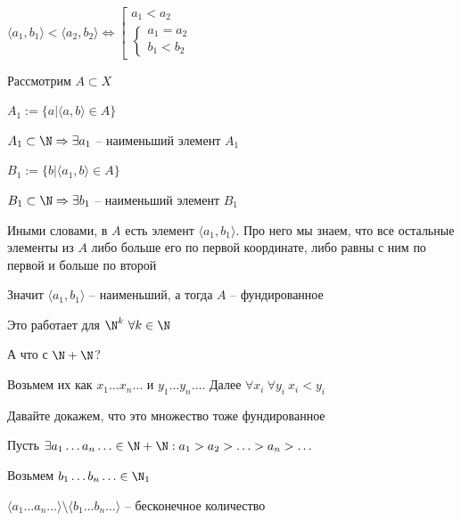 \documentclass[12pt]{article}
\begin{document}
\begin{Proof}{}

$\langle a_1, b_1 \rangle < \langle a_2, b_2 \rangle \Leftrightarrow \left[ \begin{gathered}
    a_1 < a_2 \\
    \begin{cases}
        a_1 = a_2 \\
        b_1 < b_2
    \end{cases}
\end{gathered} \right.$

Рассмотрим $A \subset X$

$A_1 := \{ a | \langle a, b \rangle \in A \}$

$A_1 \subset \N \Rightarrow \exists a_1$ -- наименьший элемент $A_1$

$B_1 := \{b | \langle a_1, b \rangle \in A\}$

$B_1 \subset \N \Rightarrow \exists b_1$ -- наименьший элемент $B_1$

Иными словами, в $A$ есть элемент $\langle a_1, b_1 \rangle$. Про него мы знаем, что все остальные элементы из $A$ либо больше его по первой координате, либо равны с ним по первой и больше по второй

Значит $\langle a_1, b_1 \rangle$ -- наименьший, а тогда $A$ -- фундированное

\end{Proof}

\begin{Remark}{}
    Это работает для $\N^k\ \forall k \in \N$
\end{Remark}

\begin{theo}{}
    А что с $\N + \N$?

    Возьмем их как $x_1 \ldots x_n \ldots$ и $y_1 \ldots y_n \ldots$. Далее $\forall x_i\ \forall y_i\ x_i < y_i$

    Давайте докажем, что это множество тоже фундированное
\end{theo}

\begin{Proof}{}

Пусть $\exists a_1 \ldots a_n \ldots \in \N + \N : a_1 > a_2 > \ldots > a_n > \ldots$

Возьмем $b_1 \ldots b_n \ldots \in \N_1$

$\langle a_1 \ldots a_n \ldots \rangle \setminus \langle b_1 \ldots b_n \ldots \rangle$ -- бесконечное количество

\end{Proof}
\end{document}
